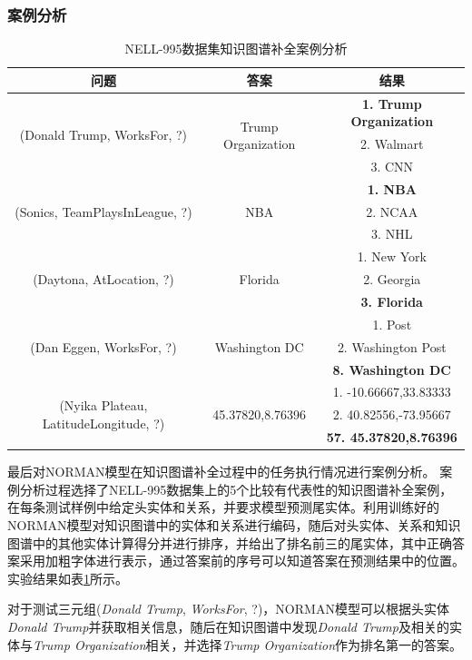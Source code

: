 \documentclass[algorithmlist, AutoFakeBold, AutoFakeSlant, figurelist, tablelist, nomlist, engineering, openany]{seuthesix} %
\begin{document}
\subsubsection{案例分析}
\begin{table}[t]
  \centering
  \caption{NELL-995数据集知识图谱补全案例分析}
  \begin{tabular*}{1\textwidth}{@{\extracolsep{\fill}}ccc}
    \toprule[1pt] 
    问题 & 答案 & 结果 \\ \hline
    \multirow{3}{*}{(Donald Trump, WorksFor, ?)} & \multirow{3}{*}{Trump Organization} & \textbf{1. Trump Organization} \\ & & 2. Walmart \\ & & 3. CNN\\\hline
    \multirow{3}{*}{(Sonics, TeamPlaysInLeague, ?)} & \multirow{3}{*}{NBA} & \textbf{1. NBA} \\ & & 2. NCAA \\ & & 3. NHL\\\hline
    \multirow{3}{*}{(Daytona, AtLocation, ?)} & \multirow{3}{*}{Florida} & 1. New York \\ & & 2. Georgia \\ & & \textbf{3. Florida}\\\hline
    \multirow{3}{*}{(Dan Eggen, WorksFor, ?)} & \multirow{3}{*}{Washington DC} & 1. Post \\ & & 2. Washington Post \\ & & \textbf{8. Washington DC}\\\hline
    \multirow{3}{*}{(Nyika Plateau, LatitudeLongitude, ?)} & \multirow{3}{*}{45.37820,8.76396} & 1. -10.66667,33.83333 \\ & & 2. 40.82556,-73.95667 \\ & & \textbf{57. 45.37820,8.76396}\\
    \bottomrule[1pt]
  \end{tabular*}
  \label{Experiment1_CaseStudy}
\end{table}

最后对NORMAN模型在知识图谱补全过程中的任务执行情况进行案例分析。
案例分析过程选择了NELL-995数据集上的5个比较有代表性的知识图谱补全案例，在每条测试样例中给定头实体和关系，并要求模型预测尾实体。利用训练好的NORMAN模型对知识图谱中的实体和关系进行编码，随后对头实体、关系和知识图谱中的其他实体计算得分并进行排序，并给出了排名前三的尾实体，其中正确答案采用加粗字体进行表示，通过答案前的序号可以知道答案在预测结果中的位置。实验结果如表\ref{Experiment1_CaseStudy}所示。

对于测试三元组(\textit{Donald Trump}, \textit{WorksFor}, ?)，NORMAN模型可以根据头实体\textit{Donald Trump}并获取相关信息，随后在知识图谱中发现\textit{Donald Trump}及相关的实体与\textit{Trump Organization}相关，并选择\textit{Trump Organization}作为排名第一的答案。
\end{document}

